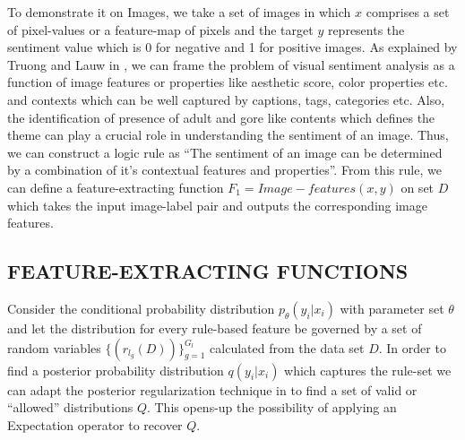 \documentclass[12pt,a4paper]{article}
\begin{document}
To demonstrate it on Images, we take a set of images in which $x$ comprises a set of pixel-values or a feature-map of pixels and the target $y$ represents the sentiment value which is 0 for negative and 1 for positive images. As explained by Truong and Lauw in \cite{Truong:2017}, we can frame the problem of visual sentiment analysis as a function of image features or properties like aesthetic score, color properties etc. and contexts which can be well captured by captions, tags, categories etc. Also, the identification of presence of adult and gore like contents which defines the theme can play a crucial role in understanding the sentiment of an image. Thus, we can construct a logic rule as ``The sentiment of an image can be determined by a combination of it's contextual features and properties''. From this rule, we can define a feature-extracting function \begin{math}F_1 = Image-features(x,y)\end{math} on set $D$ which takes the input image-label pair and outputs the corresponding image features.
\vspace{2mm}

\subsection{FEATURE-EXTRACTING FUNCTIONS}

Consider the conditional probability distribution \begin{math}p_\theta(y_i|x_i)\end{math} with parameter set $\theta$ and let the distribution for every rule-based feature be governed by a set of random variables \begin{math}\{ (r_{l_g}(D)) \}_{g=1}^{G_l}\end{math} calculated from the data set \begin{math}D\end{math}. In order to find a posterior probability distribution \begin{math}q(y_i|x_i)\end{math} which captures the rule-set we can adapt the posterior regularization technique in \cite{Ganchev:2010} to find a set of valid or ``allowed'' distributions \begin{math}Q\end{math}. This opens-up the possibility of applying an Expectation operator to recover \begin{math}Q\end{math}.
\vspace{2mm}
\end{document}
